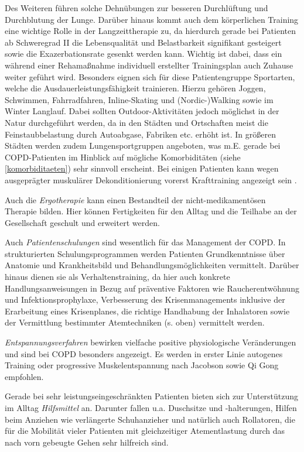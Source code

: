 Des Weiteren führen solche Dehnübungen zur besseren Durchlüftung und Durchblutung der Lunge. 
Darüber hinaus kommt auch dem körperlichen Training eine wichtige Rolle in der Langzeittherapie zu, da hierdurch gerade bei Patienten ab Schweregrad II die Lebensqualität und Belastbarkeit signifikant gesteigert sowie die Exazerbationsrate gesenkt werden kann. Wichtig ist dabei, dass ein während einer Rehamaßnahme individuell erstellter Trainingsplan auch Zuhause weiter geführt wird. Besonders eignen sich für diese Patientengruppe Sportarten, welche die Ausdauerleistungsfähigkeit trainieren. Hierzu gehören Joggen, Schwimmen, Fahrradfahren, Inline-Skating und (Nordic-)Walking sowie im Winter Langlauf. Dabei sollten Outdoor-Aktivitäten jedoch möglichst in der Natur durchgeführt werden, da in den Städten und Ortschaften meist die Feinstaubbelastung durch Autoabgase, Fabriken etc. erhöht ist. In größeren Städten werden zudem Lungensportgruppen angeboten, was m.E. gerade bei COPD-Patienten im Hinblick auf mögliche Komorbiditäten (siehe \ref{komorbiditaeten}) sehr sinnvoll erscheint. Bei einigen Patienten kann wegen ausgeprägter muskulärer Dekonditionierung vorerst Krafttraining angezeigt sein \autocite[vgl.][291f]{lang2007}.

Auch die \emph{Ergotherapie} kann einen Bestandteil der nicht-medikamentösen Therapie bilden. Hier können Fertigkeiten für den Alltag und die Teilhabe an der Gesellschaft geschult und erweitert werden.

Auch \emph{Patientenschulungen} sind wesentlich für das Management der COPD. 
In strukturierten Schulungsprogrammen werden Patienten Grundkenntnisse über Anatomie und Krankheitsbild und Behandlungsmöglichkeiten vermittelt. Darüber hinaus dienen sie als Verhaltenstraining, da hier auch konkrete Handlungsanweisungen in Bezug auf präventive Faktoren wie Raucherentwöhnung und Infektionsprophylaxe, Verbesserung des Krisenmanagements inklusive der Erarbeitung eines Krisenplanes, die richtige Handhabung der Inhalatoren sowie der Vermittlung bestimmter Atemtechniken (s. oben) vermittelt werden.

\emph{Entspannungsverfahren} bewirken vielfache positive physiologische Veränderungen und sind bei COPD besonders angezeigt. Es werden in erster Linie autogenes Training oder progressive Muskelentspannung nach Jacobson sowie Qi Gong empfohlen.

Gerade bei sehr leistungseingeschränkten Patienten bieten sich zur Unterstützung im Alltag \emph{Hilfsmittel} an. Darunter fallen u.a. Duschsitze und -halterungen, Hilfen beim Anziehen wie verlängerte Schuhanzieher und natürlich auch Rollatoren, die für die Mobilität vieler Patienten mit gleichzeitiger Atementlastung durch das nach vorn gebeugte Gehen sehr hilfreich sind.

